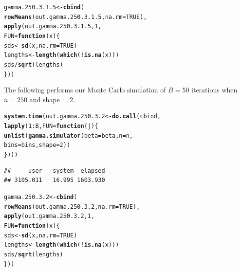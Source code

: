 \documentclass[11pt]{article}\usepackage[]{graphicx}\usepackage[]{color}
\makeatletter
\newcommand{\hlnum}[1]{\textcolor[rgb]{0.686,0.059,0.569}{#1}}%
\newcommand{\hlopt}[1]{\textcolor[rgb]{0,0,0}{#1}}%
\newcommand{\hlstd}[1]{\textcolor[rgb]{0.345,0.345,0.345}{#1}}%
\newcommand{\hlkwa}[1]{\textcolor[rgb]{0.161,0.373,0.58}{\textbf{#1}}}%
\newcommand{\hlkwb}[1]{\textcolor[rgb]{0.69,0.353,0.396}{#1}}%
\newcommand{\hlkwc}[1]{\textcolor[rgb]{0.333,0.667,0.333}{#1}}%
\newcommand{\hlkwd}[1]{\textcolor[rgb]{0.737,0.353,0.396}{\textbf{#1}}}%
\newenvironment{kframe}{%
 \def\at@end@of@kframe{}%
 \ifinner\ifhmode%
  \def\at@end@of@kframe{\end{minipage}}%
  \begin{minipage}{\columnwidth}%
 \fi\fi%
 \def\FrameCommand##1{\hskip\@totalleftmargin \hskip-\fboxsep
 \colorbox{shadecolor}{##1}\hskip-\fboxsep
     \hskip-\linewidth \hskip-\@totalleftmargin \hskip\columnwidth}%
 \MakeFramed {\advance\hsize-\width
   \@totalleftmargin\z@ \linewidth\hsize
   \@setminipage}}%
 {\par\unskip\endMakeFramed%
 \at@end@of@kframe}
\newenvironment{knitrout}{}{} %
\makeatother
\begin{document}
\begin{knitrout}
\color{fgcolor}\begin{kframe}
\begin{alltt}
\hlstd{gamma.250.3.1.5} \hlkwb{<-} \hlkwd{cbind}\hlstd{(}
  \hlkwd{rowMeans}\hlstd{(out.gamma.250.3.1.5,} \hlkwc{na.rm} \hlstd{=} \hlnum{TRUE}\hlstd{),}
  \hlkwd{apply}\hlstd{(out.gamma.250.3.1.5,} \hlnum{1}\hlstd{,}
  \hlkwc{FUN} \hlstd{=} \hlkwa{function}\hlstd{(}\hlkwc{x}\hlstd{)\{}
    \hlstd{sds} \hlkwb{<-} \hlkwd{sd}\hlstd{(x,} \hlkwc{na.rm} \hlstd{=} \hlnum{TRUE}\hlstd{)}
    \hlstd{lengths} \hlkwb{<-} \hlkwd{length}\hlstd{(}\hlkwd{which}\hlstd{(}\hlopt{!}\hlkwd{is.na}\hlstd{(x)))}
    \hlstd{sds} \hlopt{/} \hlkwd{sqrt}\hlstd{(lengths)}
  \hlstd{\}))}
\end{alltt}
\end{kframe}
\end{knitrout}

The following performs our Monte Carlo simulation of $B = 50$ iterations 
when $n = 250$ and shape = $2$.

\begin{knitrout}
\color{fgcolor}\begin{kframe}
\begin{alltt}
\hlkwd{system.time}\hlstd{(out.gamma.250.3.2} \hlkwb{<-} \hlkwd{do.call}\hlstd{(cbind,}
  \hlkwd{lapply}\hlstd{(}\hlnum{1}\hlopt{:}\hlstd{B,} \hlkwc{FUN} \hlstd{=} \hlkwa{function}\hlstd{(}\hlkwc{j}\hlstd{)\{}
    \hlkwd{unlist}\hlstd{(}\hlkwd{gamma.simulator}\hlstd{(}\hlkwc{beta} \hlstd{= beta,} \hlkwc{n} \hlstd{= n,}
      \hlkwc{bins} \hlstd{= bins,} \hlkwc{shape} \hlstd{=} \hlnum{2}\hlstd{))}
\hlstd{\})))}
\end{alltt}
\begin{verbatim}
##     user   system  elapsed 
## 3105.011   16.995 1603.930
\end{verbatim}
\end{kframe}
\end{knitrout}

\begin{knitrout}
\color{fgcolor}\begin{kframe}
\begin{alltt}
\hlstd{gamma.250.3.2} \hlkwb{<-} \hlkwd{cbind}\hlstd{(}
  \hlkwd{rowMeans}\hlstd{(out.gamma.250.3.2,} \hlkwc{na.rm} \hlstd{=} \hlnum{TRUE}\hlstd{),}
  \hlkwd{apply}\hlstd{(out.gamma.250.3.2,} \hlnum{1}\hlstd{,}
  \hlkwc{FUN} \hlstd{=} \hlkwa{function}\hlstd{(}\hlkwc{x}\hlstd{)\{}
    \hlstd{sds} \hlkwb{<-} \hlkwd{sd}\hlstd{(x,} \hlkwc{na.rm} \hlstd{=} \hlnum{TRUE}\hlstd{)}
    \hlstd{lengths} \hlkwb{<-} \hlkwd{length}\hlstd{(}\hlkwd{which}\hlstd{(}\hlopt{!}\hlkwd{is.na}\hlstd{(x)))}
    \hlstd{sds} \hlopt{/} \hlkwd{sqrt}\hlstd{(lengths)}
  \hlstd{\}))}
\end{alltt}
\end{kframe}
\end{knitrout}
\end{document}

